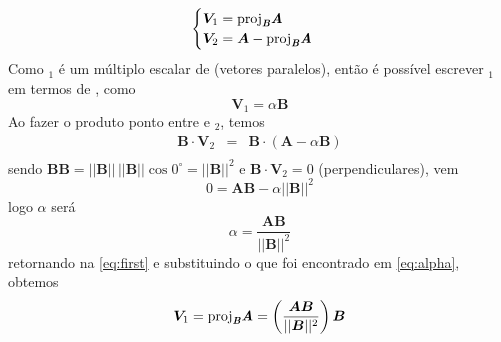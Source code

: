 \documentclass[a4paper, 12pt, brazilian]{article}
\newcommand{\bfit}[1]{\textit{\textbf{#1}}}
\newcommand{\proj}[2]{\textrm{proj}_{\bfit{#1}}\bfit{#2}}
\begin{document}
	$$
	\begin{cases}
		\bm{V}_{1}=\proj{B}{A}\\
		\bm{V}_{2}=\bm{A}-\proj{B}{A}
	\end{cases}
	$$	
	Como $_{1}$ é um múltiplo escalar de  (vetores paralelos), então é possível escrever $_{1}$ em termos de , como
	\begin{equation}
		\label{eq:first}
		\bm{V}_{1}=\alpha\bm{B}
	\end{equation}
	Ao fazer o produto ponto entre  e $_{2}$, temos
	\begin{eqnarray}
		\bm{B}\cdot\bm{V}_{2}&=&\bm{B}\cdot(\bm{A}-\alpha\bm{B})\\
	\end{eqnarray}
	sendo $\bm{B}\bm{B}=||\bm{B}||\,||\bm{B}||\cos 0^{\circ}=||\bm{B}||^{2}$ e $\bm{B}\cdot\bm{V}_{2}=0$ (perpendiculares), vem
	\begin{equation}
		0=\bm{A}\bm{B}-\alpha ||\bm{B}||^{2}
	\end{equation}
	logo $\alpha$ será
	\begin{equation}
		\label{eq:alpha}
		\alpha=\dfrac{\bm{A}\bm{B}}{||\bm{B}||^{2}}
	\end{equation}
	retornando na \cref{eq:first} e substituindo o que foi encontrado em \cref{eq:alpha}, obtemos
	\begin{equation}
		\bm{V}_{1}=\proj{B}{A}=\left(\dfrac{\bm{A}\bm{B}}{||\bm{B}||^{2}}\right)\bm{B}
	\end{equation}
\end{document}
